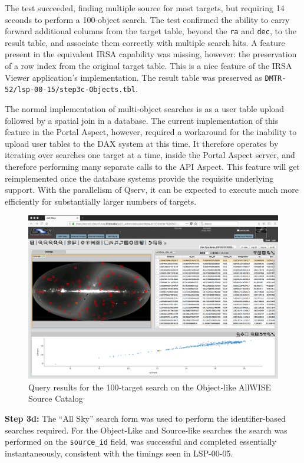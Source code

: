 The test succeeded, finding multiple source for most targets, but requiring 14 seconds to perform a 100-object search.
The test confirmed the ability to carry forward additional columns from the target table, beyond the \verb|ra| and \verb|dec|,
to the result table, and associate them correctly with multiple search hits.
A feature present in the equivalent IRSA capability was missing, however: the preservation of a row index from the original target table.
This is a nice feature of the IRSA Viewer application's implementation.
The result table was preserved as \verb|DMTR-52/lsp-00-15/step3c-Objects.tbl|.

The normal implementation of multi-object searches is as a user table upload followed by a spatial join in a database.
The current implementation of this feature in the Portal Aspect, however,
required a workaround for the inability to upload user tables to the DAX system at this time.
It therefore operates by iterating over searches one target at a time, inside the Portal Aspect server,
and therefore performing many separate calls to the API Aspect.
This feature will get reimplemented once the database systems provide the requisite underlying support.
With the parallelism of Qserv, it can be expected to execute much more efficiently for substantially
larger numbers of targets.

\begin{figure}
  \includegraphics[width=\linewidth]{lsp-00-15/step3c-Objects.png}
  \caption{Query results for the 100-target search on the Object-like AllWISE Source Catalog}
  \label{fig:lsp-00-15-multi-search}
\end{figure}


\textbf{Step 3d:} The ``All Sky'' search form was used to perform the identifier-based searches required.
For the Object-Like and Source-like searches the search was performed on the \verb|source_id| field,
was successful and completed essentially instantaneously, consistent with the timings seen in LSP-00-05.

